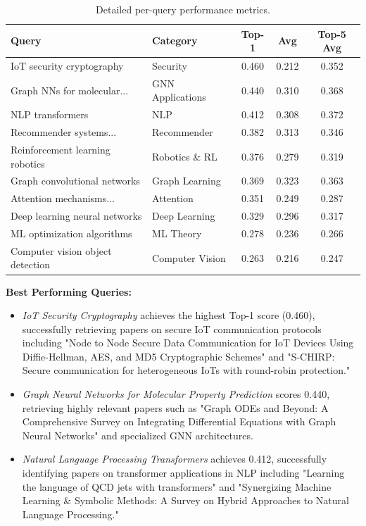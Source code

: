 \documentclass[pdflatex,sn-mathphys-num]{sn-jnl}
\theoremstyle{thmstyleone}%
\theoremstyle{thmstyletwo}%
\theoremstyle{thmstylethree}%
\begin{document}
\begin{table}[t]
\centering
\caption{Detailed per-query performance metrics.}
\label{tab:perquery}
\begin{tabular}{llccc}
\toprule
\textbf{Query} & \textbf{Category} & \textbf{Top-1} & \textbf{Avg} & \textbf{Top-5 Avg} \\
\midrule
IoT security cryptography & Security & 0.460 & 0.212 & 0.352 \\
Graph NNs for molecular... & GNN Applications & 0.440 & 0.310 & 0.368 \\
NLP transformers & NLP & 0.412 & 0.308 & 0.372 \\
Recommender systems... & Recommender & 0.382 & 0.313 & 0.346 \\
Reinforcement learning robotics & Robotics \& RL & 0.376 & 0.279 & 0.319 \\
Graph convolutional networks & Graph Learning & 0.369 & 0.323 & 0.363 \\
Attention mechanisms... & Attention & 0.351 & 0.249 & 0.287 \\
Deep learning neural networks & Deep Learning & 0.329 & 0.296 & 0.317 \\
ML optimization algorithms & ML Theory & 0.278 & 0.236 & 0.266 \\
Computer vision object detection & Computer Vision & 0.263 & 0.216 & 0.247 \\
\bottomrule
\end{tabular}
\end{table}

\textbf{Best Performing Queries:}

\begin{itemize}
    \item \textit{IoT Security Cryptography} achieves the highest Top-1 score (0.460), successfully retrieving papers on secure IoT communication protocols including "Node to Node Secure Data Communication for IoT Devices Using Diffie-Hellman, AES, and MD5 Cryptographic Schemes" and "S-CHIRP: Secure communication for heterogeneous IoTs with round-robin protection."

    \item \textit{Graph Neural Networks for Molecular Property Prediction} scores 0.440, retrieving highly relevant papers such as "Graph ODEs and Beyond: A Comprehensive Survey on Integrating Differential Equations with Graph Neural Networks" and specialized GNN architectures.

    \item \textit{Natural Language Processing Transformers} achieves 0.412, successfully identifying papers on transformer applications in NLP including "Learning the language of QCD jets with transformers" and "Synergizing Machine Learning \& Symbolic Methods: A Survey on Hybrid Approaches to Natural Language Processing."
\end{itemize}
\end{document}
